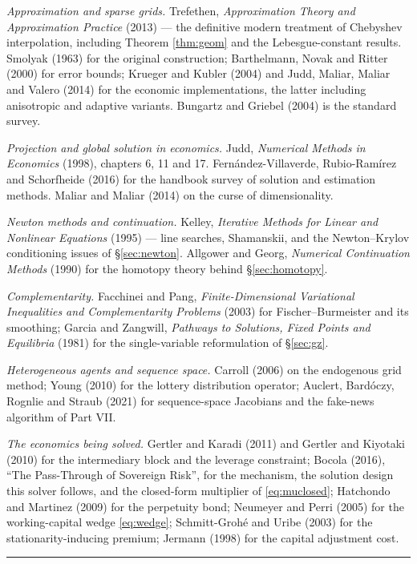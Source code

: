 \documentclass[10pt,a4paper]{article}
\theoremstyle{definition}
\theoremstyle{plain}
\theoremstyle{remark}
\begin{document}
\noindent\emph{Approximation and sparse grids.} Trefethen, \emph{Approximation Theory and
Approximation Practice} (2013) --- the definitive modern treatment of Chebyshev interpolation,
including Theorem \ref{thm:geom} and the Lebesgue-constant results. Smolyak (1963) for the
original construction; Barthelmann, Novak and Ritter (2000) for error bounds; Krueger and
Kubler (2004) and Judd, Maliar, Maliar and Valero (2014) for the economic implementations,
the latter including anisotropic and adaptive variants. Bungartz and Griebel (2004) is the
standard survey.

\noindent\emph{Projection and global solution in economics.} Judd, \emph{Numerical Methods in
Economics} (1998), chapters 6, 11 and 17. Fernández-Villaverde, Rubio-Ramírez and
Schorfheide (2016) for the handbook survey of solution and estimation methods.
Maliar and Maliar (2014) on the curse of dimensionality.

\noindent\emph{Newton methods and continuation.} Kelley, \emph{Iterative Methods for Linear
and Nonlinear Equations} (1995) --- line searches, Shamanskii, and the Newton--Krylov
conditioning issues of \S\ref{sec:newton}. Allgower and Georg, \emph{Numerical Continuation
Methods} (1990) for the homotopy theory behind \S\ref{sec:homotopy}.

\noindent\emph{Complementarity.} Facchinei and Pang, \emph{Finite-Dimensional Variational
Inequalities and Complementarity Problems} (2003) for Fischer--Burmeister and its smoothing;
Garcia and Zangwill, \emph{Pathways to Solutions, Fixed Points and Equilibria} (1981) for the
single-variable reformulation of \S\ref{sec:gz}.

\noindent\emph{Heterogeneous agents and sequence space.} Carroll (2006) on the endogenous
grid method; Young (2010) for the lottery distribution operator; Auclert, Bardóczy, Rognlie
and Straub (2021) for sequence-space Jacobians and the fake-news algorithm of Part VII.

\noindent\emph{The economics being solved.} Gertler and Karadi (2011) and Gertler and
Kiyotaki (2010) for the intermediary block and the leverage constraint; Bocola (2016),
``The Pass-Through of Sovereign Risk'', for the mechanism, the solution design this solver
follows, and the closed-form multiplier of \eqref{eq:muclosed}; Hatchondo and Martinez (2009)
for the perpetuity bond; Neumeyer and Perri (2005) for the working-capital wedge
\eqref{eq:wedge}; Schmitt-Grohé and Uribe (2003) for the stationarity-inducing premium;
Jermann (1998) for the capital adjustment cost.

\vfill
\noindent\rule{\textwidth}{0.4pt}

\end{document}
